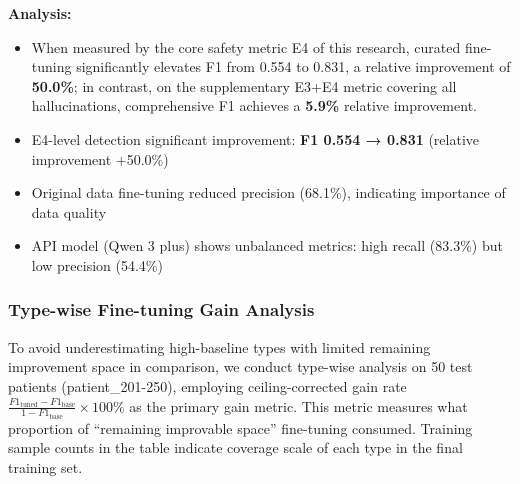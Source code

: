 \documentclass[11pt]{article}
\begin{document}
\textbf{Analysis:}

\begin{itemize}
\item
  When measured by the core safety metric E4 of this research, curated fine-tuning significantly elevates F1 from 0.554 to 0.831, a relative improvement of \textbf{50.0\%}; in contrast, on the supplementary E3+E4 metric covering all hallucinations, comprehensive F1 achieves a \textbf{5.9\%} relative improvement.
\item
  E4-level detection significant improvement: \textbf{F1 0.554 → 0.831} (relative improvement +50.0\%)
\item
  Original data fine-tuning reduced precision (68.1\%), indicating importance of data quality
\item
  API model (Qwen 3 plus) shows unbalanced metrics: high recall (83.3\%) but low precision (54.4\%)
\end{itemize}

\subsubsection{Type-wise Fine-tuning Gain Analysis}

To avoid underestimating high-baseline types with limited remaining improvement space in comparison, we conduct type-wise analysis on 50 test patients (patient\_201-250), employing ceiling-corrected gain rate \(\frac{F1_{\text{tuned}} - F1_{\text{base}}}{1 - F1_{\text{base}}} \times 100\%\) as the primary gain metric. This metric measures what proportion of ``remaining improvable space'' fine-tuning consumed. Training sample counts in the table indicate coverage scale of each type in the final training set.
\end{document}

